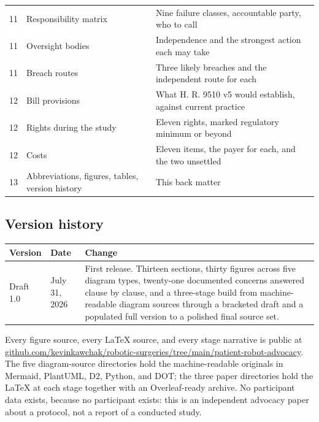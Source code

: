 \begin{tabularx}{\textwidth}{C{1.0cm} L{4.6cm} Y}
11 & Responsibility matrix & Nine failure classes, accountable party, who to call \\
11 & Oversight bodies & Independence and the strongest action each may take \\
11 & Breach routes & Three likely breaches and the independent route for each \\
12 & Bill provisions & What H. R. 9510 v5 would establish, against current practice \\
12 & Rights during the study & Eleven rights, marked regulatory minimum or beyond \\
12 & Costs & Eleven items, the payer for each, and the two unsettled \\
13 & Abbreviations, figures, tables, version history & This back matter \\
\bottomrule
\end{tabularx}

\vspace{0.30em}

\subsection{Version history}

\vspace{0.30em}

\noindent\begin{tabularx}{\textwidth}{L{2.0cm} L{2.6cm} Y}
\toprule
\textbf{Version} & \textbf{Date} & \textbf{Change} \\
\midrule
Draft 1.0 & July 31, 2026 & First release. Thirteen sections, thirty figures across five diagram types, twenty-one documented concerns answered clause by clause, and a three-stage build from machine-readable diagram sources through a bracketed draft and a populated full version to a polished final source set. \\
\bottomrule
\end{tabularx}

\vspace{0.30em}


Every figure source, every LaTeX source, and every stage narrative is public at
\href{https://github.com/kevinkawchak/robotic-surgeries/tree/main/patient-robot-advocacy}{github.com/kevinkawchak/robotic-surgeries/tree/main/patient-robot-advocacy}.
The five diagram-source directories hold the machine-readable originals in
Mermaid, PlantUML, D2, Python, and DOT; the three paper directories hold the
LaTeX at each stage together with an Overleaf-ready archive. No participant data
exists, because no participant exists: this is an independent advocacy paper
about a protocol, not a report of a conducted study.

